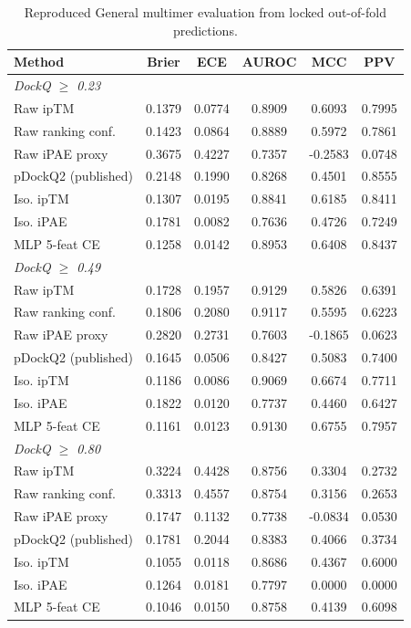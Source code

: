 \begin{table}[t]
\centering
\caption{Reproduced General multimer evaluation from locked out-of-fold predictions.}
\label{tab:general_reproduced}
\begin{tabular}{lccccc}
\toprule
Method & Brier & ECE & AUROC & MCC & PPV \\
\midrule
\multicolumn{6}{l}{\textit{DockQ $\geq$ 0.23}} \\
Raw ipTM & 0.1379 & 0.0774 & 0.8909 & 0.6093 & 0.7995 \\
Raw ranking conf. & 0.1423 & 0.0864 & 0.8889 & 0.5972 & 0.7861 \\
Raw iPAE proxy & 0.3675 & 0.4227 & 0.7357 & -0.2583 & 0.0748 \\
pDockQ2 (published) & 0.2148 & 0.1990 & 0.8268 & 0.4501 & 0.8555 \\
Iso. ipTM & 0.1307 & 0.0195 & 0.8841 & 0.6185 & 0.8411 \\
Iso. iPAE & 0.1781 & 0.0082 & 0.7636 & 0.4726 & 0.7249 \\
MLP 5-feat CE & 0.1258 & 0.0142 & 0.8953 & 0.6408 & 0.8437 \\
\midrule
\multicolumn{6}{l}{\textit{DockQ $\geq$ 0.49}} \\
Raw ipTM & 0.1728 & 0.1957 & 0.9129 & 0.5826 & 0.6391 \\
Raw ranking conf. & 0.1806 & 0.2080 & 0.9117 & 0.5595 & 0.6223 \\
Raw iPAE proxy & 0.2820 & 0.2731 & 0.7603 & -0.1865 & 0.0623 \\
pDockQ2 (published) & 0.1645 & 0.0506 & 0.8427 & 0.5083 & 0.7400 \\
Iso. ipTM & 0.1186 & 0.0086 & 0.9069 & 0.6674 & 0.7711 \\
Iso. iPAE & 0.1822 & 0.0120 & 0.7737 & 0.4460 & 0.6427 \\
MLP 5-feat CE & 0.1161 & 0.0123 & 0.9130 & 0.6755 & 0.7957 \\
\midrule
\multicolumn{6}{l}{\textit{DockQ $\geq$ 0.80}} \\
Raw ipTM & 0.3224 & 0.4428 & 0.8756 & 0.3304 & 0.2732 \\
Raw ranking conf. & 0.3313 & 0.4557 & 0.8754 & 0.3156 & 0.2653 \\
Raw iPAE proxy & 0.1747 & 0.1132 & 0.7738 & -0.0834 & 0.0530 \\
pDockQ2 (published) & 0.1781 & 0.2044 & 0.8383 & 0.4066 & 0.3734 \\
Iso. ipTM & 0.1055 & 0.0118 & 0.8686 & 0.4367 & 0.6000 \\
Iso. iPAE & 0.1264 & 0.0181 & 0.7797 & 0.0000 & 0.0000 \\
MLP 5-feat CE & 0.1046 & 0.0150 & 0.8758 & 0.4139 & 0.6098 \\
\bottomrule
\end{tabular}
\end{table}

